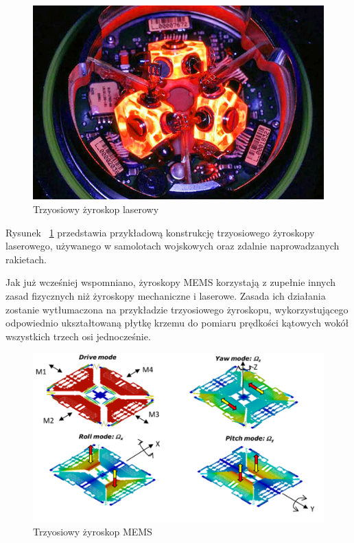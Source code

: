 \begin{figure}[H]
	\centering
	\includegraphics[scale=0.4]{Pictures/3d_laser_ring_gyro.jpg}
        \caption[Trzyosiowy żyroskop laserowy]{Trzyosiowy żyroskop laserowy}
        \label{fig:3d_laser_ring_gyro}
\end{figure}

Rysunek ~\ref{fig:3d_laser_ring_gyro} przedstawia przykładową konstrukcję trzyosiowego żyroskopy laserowego, używanego w samolotach wojskowych oraz zdalnie naprowadzanych rakietach. 

Jak już wcześniej wspomniano, żyroskopy MEMS korzystają z zupełnie innych zasad fizycznych niż żyroskopy mechaniczne i laserowe. Zasada ich działania zostanie wytłumaczona na przykładzie trzyosiowego żyroskopu, wykorzystującego odpowiednio ukształtowaną płytkę krzemu do pomiaru prędkości kątowych wokół wszystkich trzech osi jednocześnie.

\begin{figure}[H]
	\centering
	\includegraphics[scale=0.4]{Pictures/3d_gyro.png}
        \caption[Trzyosiowy żyroskop MEMS]{Trzyosiowy żyroskop MEMS}
        \label{fig:3d_gyro}
\end{figure}


